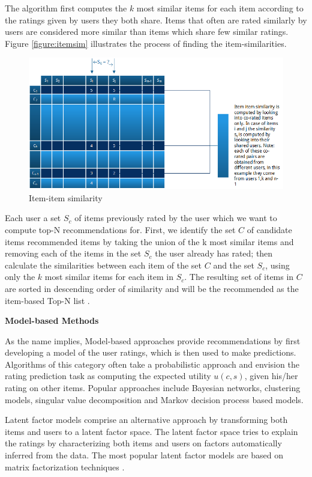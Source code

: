 The algorithm first computes the $k$ most similar items for each item according to the ratings given by users they both share. Items that often are rated similarly by users are considered more similar than items which share few similar ratings. Figure \ref{figure:itemsim} illustrates the process of finding the item-similarities.

\begin{figure}[H]
    \includegraphics[width=5in]{image/itemsim.png}
    \centering
    \caption[Item-item similarity]{Item-item similarity}
    \label{figure:ratingmatrix}
\end{figure}

Each user a set $S_{c}$ of items previously rated by the user which we want to compute top-N recommendations for. First, we identify the set $C$ of candidate items recommended items by taking the union of the k most similar items and removing each of the items in the set $S_{c}$ the user already has rated; then calculate the similarities between each item of the set $C$ and the set $S_{c}$, using only the $k$ most similar items for each item in $S_{c}$. The resulting set of items in $C$ are sorted in descending order of similarity and will be the recommended as the item-based Top-N list \cite{Karypis2001}.

\textbf{Model-based Methods}

As the name implies, Model-based approaches provide recommendations by first developing a model of the user ratings, which is then used to make predictions. Algorithms of this category often take a probabilistic approach and envision the rating prediction task as computing the expected utility $u(c,s)$, given his/her rating on other items. Popular approaches include Bayesian networks, clustering models, singular value decomposition and Markov decision process based models.

Latent factor models comprise an alternative approach by transforming both items and users to a latent factor space. The latent factor space tries to explain the ratings by characterizing both items and users on factors automatically inferred from the data. The most popular latent factor models are based on matrix factorization techniques \cite{Koren2009}.

